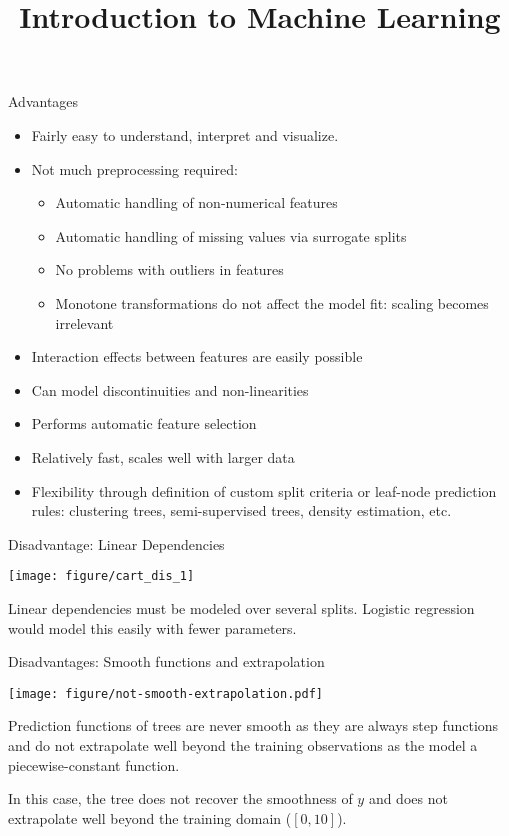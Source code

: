 \documentclass[11pt,compress,t,notes=noshow, xcolor=table]{beamer}
\title{Introduction to Machine Learning}
\institute{\href{https://compstat-lmu.github.io/lecture_i2ml/}{compstat-lmu.github.io/lecture\_i2ml}}
\date{}
\begin{document}

\sloppy

\begin{vbframe}{Advantages}
  \begin{itemize}
    \item Fairly easy to understand, interpret and visualize.
    \item Not much preprocessing required:
    \begin{itemize}
      \item Automatic handling of non-numerical features
      \item Automatic handling of missing values via surrogate splits
      \item No problems with outliers in features
      \item Monotone transformations do not affect the model fit: scaling becomes irrelevant
    \end{itemize}
    \item Interaction effects between features are easily possible
    \item Can model discontinuities and non-linearities
    \item Performs automatic feature selection
    \item Relatively fast, scales well with larger data
    \item Flexibility through definition of custom split criteria or leaf-node prediction rules: clustering trees, semi-supervised trees, density estimation, etc.
    \end{itemize}
\end{vbframe}

\begin{vbframe}{Disadvantage: Linear Dependencies}

{\centering \texttt{[image: figure/cart\_dis\_1]} 

}


Linear dependencies must be modeled over several splits. 
Logistic regression would model this easily with fewer parameters.
\end{vbframe}

\begin{vbframe}{Disadvantages: Smooth functions and extrapolation}


{\centering \texttt{[image: figure/not-smooth-extrapolation.pdf]} 

}

Prediction functions of trees are never smooth as they are always step functions and do not extrapolate well beyond the training observations as the model a piecewise-constant function.

In this case, the tree does not recover the smoothness of $y$ and does not extrapolate well beyond the training domain ($[0, 10]$).
\end{vbframe}
\end{document}
